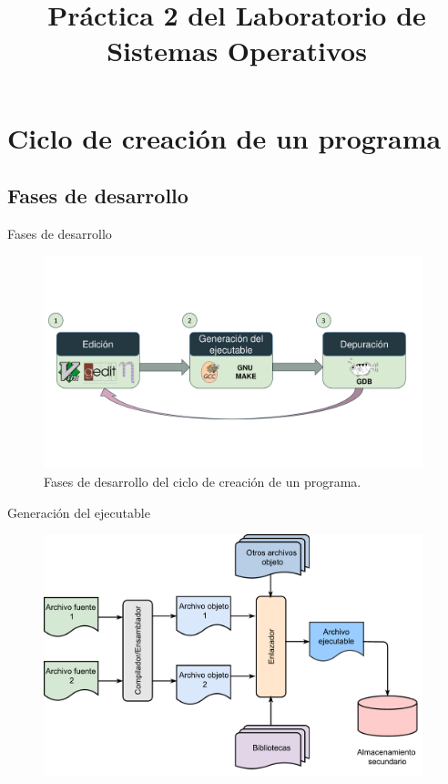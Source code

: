 \documentclass{beamer}
\title[Práctica 2 del Laboratorio de Sistemas Operativos] {Práctica 2 del Laboratorio de Sistemas Operativos}
\author[Sistemas Operativos] %
{}
\institute[Universidad de Alcalá] %
{
  \textcolor{structure} {\emph{\textbf{Departamento de Automática}}}\\
  Universidad de Alcalá



\vspace*{0.5cm}
\texttt{[image: ../../../../transparencias/comun/uah1]}
}
\date{}
\begin{document}
\begin{frame}
  \titlepage
\end{frame}

\section{Ciclo de creación de un programa}
	\subsection[Fases de desarrollo]{Fases de desarrollo}

	\usebackgroundtemplate{}
	\begin{frame}{Fases de desarrollo}

		\begin{figure}
			\begin{centering}
				\includegraphics[trim={0.25cm 3cm 0 3cm}, clip, width=11cm, page=1]{figuras/Figuras.pdf}
			\par\end{centering}
	
			\caption{\label{FasesDesarrollo}Fases de desarrollo del ciclo de creación de un programa.}
		\end{figure}
	\end{frame}
	
	
	\begin{frame}{Generación del ejecutable}

		\vspace{-0.25cm}
		\begin{figure}
			\includegraphics[width=11cm, page=1]{figuras/generarejecutable.pdf}
		\end{figure}
	\end{frame}	
	
\end{document}

